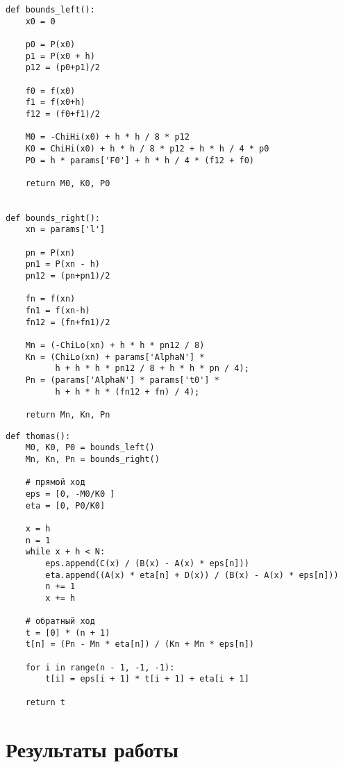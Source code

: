 \begin{lstlisting}[caption={Краевые условия},label={lst:}]
def bounds_left():
    x0 = 0

    p0 = P(x0)
    p1 = P(x0 + h)
    p12 = (p0+p1)/2

    f0 = f(x0)
    f1 = f(x0+h)
    f12 = (f0+f1)/2

    M0 = -ChiHi(x0) + h * h / 8 * p12
    K0 = ChiHi(x0) + h * h / 8 * p12 + h * h / 4 * p0
    P0 = h * params['F0'] + h * h / 4 * (f12 + f0)

    return M0, K0, P0


def bounds_right():
    xn = params['l']

    pn = P(xn)
    pn1 = P(xn - h)
    pn12 = (pn+pn1)/2

    fn = f(xn)
    fn1 = f(xn-h)
    fn12 = (fn+fn1)/2

    Mn = (-ChiLo(xn) + h * h * pn12 / 8)
    Kn = (ChiLo(xn) + params['AlphaN'] *
          h + h * h * pn12 / 8 + h * h * pn / 4);
    Pn = (params['AlphaN'] * params['t0'] *
          h + h * h * (fn12 + fn) / 4);

    return Mn, Kn, Pn
\end{lstlisting}
\begin{lstlisting}[caption={Метод прогонки},label={lst:}]
def thomas():
    M0, K0, P0 = bounds_left()
    Mn, Kn, Pn = bounds_right()

    # прямой ход
    eps = [0, -M0/K0 ]
    eta = [0, P0/K0]

    x = h
    n = 1
    while x + h < N:
        eps.append(C(x) / (B(x) - A(x) * eps[n]))
        eta.append((A(x) * eta[n] + D(x)) / (B(x) - A(x) * eps[n]))
        n += 1
        x += h

    # обратный ход
    t = [0] * (n + 1)
    t[n] = (Pn - Mn * eta[n]) / (Kn + Mn * eps[n])

    for i in range(n - 1, -1, -1):
        t[i] = eps[i + 1] * t[i + 1] + eta[i + 1]

    return t
\end{lstlisting}

\section{Результаты работы}
